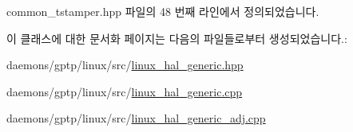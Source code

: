 common\+\_\+tstamper.\+hpp 파일의 48 번째 라인에서 정의되었습니다.



이 클래스에 대한 문서화 페이지는 다음의 파일들로부터 생성되었습니다.\+:\begin{DoxyCompactItemize}
\item 
daemons/gptp/linux/src/\hyperlink{linux__hal__generic_8hpp}{linux\+\_\+hal\+\_\+generic.\+hpp}\item 
daemons/gptp/linux/src/\hyperlink{linux__hal__generic_8cpp}{linux\+\_\+hal\+\_\+generic.\+cpp}\item 
daemons/gptp/linux/src/\hyperlink{linux__hal__generic__adj_8cpp}{linux\+\_\+hal\+\_\+generic\+\_\+adj.\+cpp}\end{DoxyCompactItemize}
